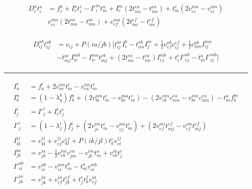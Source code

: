 


% 



\begin{align}
  \begin{split}
    D^a_i t^a_i &=
    f^a_i + I^a_e t^e_i - I{'}^m_i t^a_m + I^m_e (2 t^{ea}_{mi} - t^{ea}_{im}) + t^e_m (2 v^{ma}_{ei} - v^{am}_{ei}) \\
    & v^{mn}_{ei} (2 t^{ea}_{mn} - t^{ae}_{mn}) + v^{ma}_{ef}(2 t^{ef}_{mi} - t^{ef}_{im})
  \end{split}
  \label{t1}
\end{align}

\begin{align}
  \begin{split}
    D^{ab}_{ij} t^{ab}_{ij} &=
    v_{ij} + P (ia/j b) [ t^{ae}_{ij} I^b_e - t^{ab}_{im} I^m_j + \frac{1}{2} v^{ab}_{ef} c^{ef}_{ij} +  \frac{1}{2} c^{ab}_{mn} I^{mn}_{ij} \\
      & - t_{mj}^{ae} I_{ie}^{mb} - I_{ie}^{ma} t_{mj}^{eb} + (2t^{ea}_{mi} - t_{im}^{ea}) I_{ej}^{mb} + t_i^e I{'}_{ej}^{ab} - t_m^a I{'}_{ij}^{mb}] 
  \end{split}
  \label{t2}
\end{align}

\rule{\linewidth}{0.1mm}

\begin{align}
%
I^i_a &= f^i_a + 2 v^{im}_{ae} t^{e}_{m} - v^{im}_{ea} t^{e}_{m} \\
%
I^a_b &= (1 - \lambda^b_a) f^a_b +
         (2v^{am}_{be} t^e_m - v^{ma}_{be} t^e_m) -
         (2v^{mn}_{eb} c^{ea}_{mn} - v^{mn}_{be} c^{ea}_{mn}) -
         t^a_m f^m_b \\
%
I^i_j &= I'^i_j + I^i_e t^{e}_{j} \\
%
I'^i_j &= (1 - \lambda^i_j)f^i_j +
          (2v^{im}_{je} t^e_m - v^{im}_{ej} t^e_m) +
          (2v^{mi}_{ef} t^{ef}_{mj} - v^{im}_{ef} t^{ef}_{mj}) \\
%
I_{kl}^{ij} &= v^{ij}_{kl} + v^{ij}_{ef} c^{ef}_{kl} + P(ik/jl)t^e_k v^{ij}_{el} \\
%
I_{jb}^{ia} &= v^{ia}_{jb} - \frac{1}{2} v^{im}_{eb} c^{ea}_{jm} - v^{im}_{jb}t^a_m + v^{ia}_{eb}t^e_j \\
%
I{'}^{ab}_{ci} &= v^{ab}_{ci} - v^{am}_{ci} t^b_m - t^a_m v^{mb}_{ci} \\
I{'}^{ia}_{jk} &= v^{ia}_{jk} + v^{ia}_{ef} t^{ef}_{jk} + t^e_j t^f_k v^{ia}_{ef}
\end{align}


%



